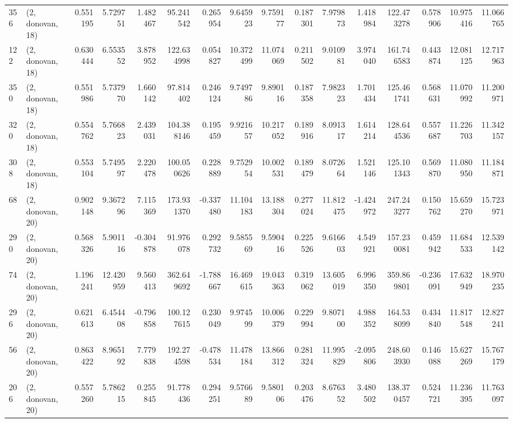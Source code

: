 \begin{tabular}{llrrrrrrrrrrrrrr}
356 &  (2, donovan, 18) &   0.551195 &   5.729751 &   1.482467 &    95.241542 &   0.265954 &   9.645923 &   9.759177 &  0.187301 &   7.979873 &   1.418984 &   122.473278 &  0.578906 &  10.975416 &  11.066765 \\
122 &  (2, donovan, 18) &   0.630444 &   6.553552 &   3.878952 &   122.634998 &   0.054827 &  10.372499 &  11.074069 &  0.211502 &   9.010981 &   3.974040 &   161.746583 &  0.443874 &  12.081125 &  12.717963 \\
350 &  (2, donovan, 18) &   0.551986 &   5.737970 &   1.660142 &    97.814402 &   0.246124 &   9.749786 &   9.890116 &  0.187358 &   7.982323 &   1.701434 &   125.461741 &  0.568631 &  11.070992 &  11.200971 \\
320 &  (2, donovan, 18) &   0.554762 &   5.766823 &   2.439031 &   104.388146 &   0.195459 &   9.921657 &  10.217052 &  0.189916 &   8.091317 &   1.614214 &   128.644536 &  0.557687 &  11.226703 &  11.342157 \\
308 &  (2, donovan, 18) &   0.553104 &   5.749597 &   2.220478 &   100.050626 &   0.228889 &   9.752954 &  10.002531 &  0.189479 &   8.072664 &   1.521146 &   125.101343 &  0.569870 &  11.080950 &  11.184871 \\
68  &  (2, donovan, 20) &   0.902148 &   9.367296 &   7.115369 &   173.931370 &  -0.337480 &  11.104183 &  13.188304 &  0.277024 &  11.812475 &  -1.424972 &   247.243277 &  0.150762 &  15.659270 &  15.723971 \\
290 &  (2, donovan, 20) &   0.568326 &   5.901116 &  -0.304878 &    91.976078 &   0.292732 &   9.585569 &   9.590416 &  0.225526 &   9.616603 &   4.549921 &   157.230081 &  0.459942 &  11.684533 &  12.539142 \\
74  &  (2, donovan, 20) &   1.196241 &  12.420959 &   9.560413 &   362.649692 &  -1.788667 &  16.469615 &  19.043363 &  0.319062 &  13.605019 &   6.996350 &   359.869801 & -0.236091 &  17.632949 &  18.970235 \\
296 &  (2, donovan, 20) &   0.621613 &   6.454408 &  -0.796858 &   100.127615 &   0.230049 &   9.974599 &  10.006379 &  0.229994 &   9.807100 &   4.988352 &   164.538099 &  0.434840 &  11.817548 &  12.827241 \\
56  &  (2, donovan, 20) &   0.863422 &   8.965192 &   7.779838 &   192.274598 &  -0.478534 &  11.478184 &  13.866312 &  0.281324 &  11.995829 &  -2.095806 &   248.603930 &  0.146088 &  15.627269 &  15.767179 \\
206 &  (2, donovan, 20) &   0.557260 &   5.786215 &   0.255845 &    91.778436 &   0.294251 &   9.576689 &   9.580106 &  0.203476 &   8.676352 &   3.480502 &   138.370457 &  0.524721 &  11.236395 &  11.763097 \\

\end{tabular}
